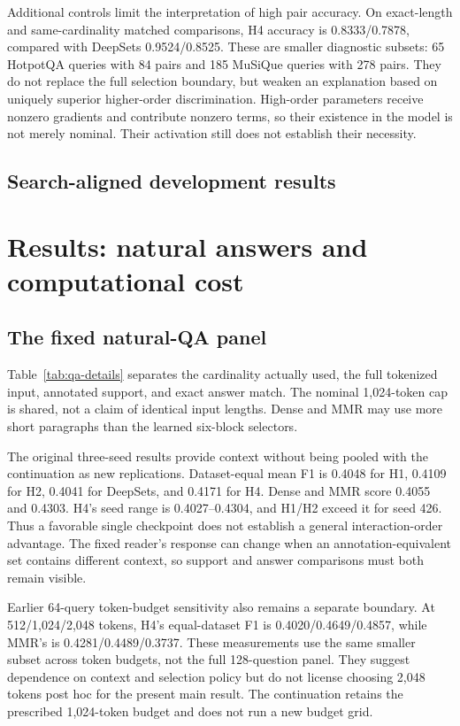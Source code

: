 \documentclass[pdflatex,sn-mathphys-num]{sn-jnl}
\begin{document}
Additional controls limit the interpretation of high pair accuracy.
On exact-length and same-cardinality matched comparisons, H4 accuracy is
0.8333/0.7878, compared with DeepSets 0.9524/0.8525. These are smaller
diagnostic subsets: 65 HotpotQA queries with 84 pairs and 185 MuSiQue queries
with 278 pairs. They do not replace the full selection boundary, but weaken
an explanation based on uniquely superior higher-order discrimination.
High-order parameters receive nonzero gradients and contribute nonzero
terms, so their existence in the model is not merely nominal. Their
activation still does not establish their necessity.

\subsection{Search-aligned development results}


\section{Results: natural answers and computational cost}
\subsection{The fixed natural-QA panel}





Table~\ref{tab:qa-details} separates the cardinality actually used, the full
tokenized input, annotated support, and exact answer match. The nominal
1,024-token cap is shared, not a claim of identical input lengths. Dense and
MMR may use more short paragraphs than the learned six-block selectors.

The original three-seed results provide context without being pooled with
the continuation as new replications. Dataset-equal mean F1 is 0.4048 for
H1, 0.4109 for H2, 0.4041 for DeepSets, and 0.4171 for H4. Dense and MMR
score 0.4055 and 0.4303. H4's seed range is 0.4027--0.4304, and H1/H2 exceed
it for seed 426. Thus a favorable single checkpoint does not establish a
general interaction-order advantage. The fixed reader's response can
change when an annotation-equivalent set contains different context, so
support and answer comparisons must both remain visible.

Earlier 64-query token-budget sensitivity also remains a separate boundary.
At 512/1,024/2,048 tokens, H4's equal-dataset F1 is
0.4020/0.4649/0.4857, while MMR's is 0.4281/0.4489/0.3737.
These measurements use the same smaller subset across token budgets, not
the full 128-question panel. They suggest dependence on context and
selection policy but do not license choosing 2,048 tokens post hoc for the
present main result. The continuation retains the prescribed 1,024-token
budget and does not run a new budget grid.
\end{document}
